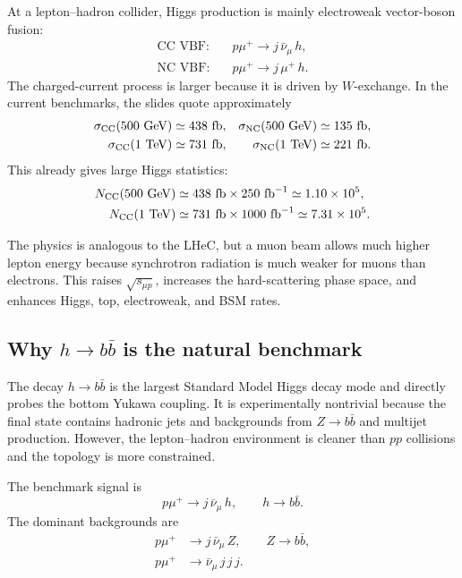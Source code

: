 \documentclass[11pt,a4paper]{article}
\newcommand{\gev}{\ensuremath{~\mathrm{GeV}}}
\newcommand{\tev}{\ensuremath{~\mathrm{TeV}}}
\newcommand{\invfb}{\ensuremath{~\mathrm{fb}^{-1}}}
\newcommand{\fb}{\ensuremath{~\mathrm{fb}}}
\newenvironment{learningnote}[1]{%
\par\medskip\noindent{\large\bfseries\color{darkblue}#1}\par\noindent
\begin{minipage}{0.97\linewidth}
}{\end{minipage}\par\medskip}
\begin{document}
At a lepton--hadron collider, Higgs production is mainly electroweak vector-boson fusion:
\begin{align}
  \text{CC VBF:}\quad & p\mu^+\to j\,\bar\nu_\mu\,h,\\
  \text{NC VBF:}\quad & p\mu^+\to j\,\mu^+\,h.
\end{align}
The charged-current process is larger because it is driven by \(W\)-exchange.  In the current
benchmarks, the slides quote approximately
\begin{align}
  \sigma_{\rm CC}(500\gev)&\simeq438\fb, &
  \sigma_{\rm NC}(500\gev)&\simeq135\fb,\\
  \sigma_{\rm CC}(1\tev)&\simeq731\fb, &
  \sigma_{\rm NC}(1\tev)&\simeq221\fb.
\end{align}
This already gives large Higgs statistics:
\begin{align}
  N_{\rm CC}(500\gev)&\simeq 438\fb\times250\invfb \simeq1.10\times10^5,\\
  N_{\rm CC}(1\tev)&\simeq 731\fb\times1000\invfb \simeq7.31\times10^5.
\end{align}

\begin{learningnote}{Why the muon beam matters}
\vspace{0.25cm}
The physics is analogous to the LHeC, but a muon beam allows much higher lepton energy
because synchrotron radiation is much weaker for muons than electrons.  This raises
\(\sqrt{s_{\mu p}}\), increases the hard-scattering phase space, and enhances Higgs, top,
electroweak, and BSM rates.
\end{learningnote}

\subsection{Why \(h\to b\bar b\) is the natural benchmark}

The decay \(h\to b\bar b\) is the largest Standard Model Higgs decay mode and directly
probes the bottom Yukawa coupling.  It is experimentally nontrivial because the final state
contains hadronic jets and backgrounds from \(Z\to b\bar b\) and multijet production.
However, the lepton--hadron environment is cleaner than \(pp\) collisions and the topology
is more constrained.

The benchmark signal is
\begin{equation}
  p\mu^+\to j\,\bar\nu_\mu\,h,\qquad h\to b\bar b .
\end{equation}
The dominant backgrounds are
\begin{align}
  p\mu^+&\to j\,\bar\nu_\mu\,Z,\qquad Z\to b\bar b,\\
  p\mu^+&\to \bar\nu_\mu\,j\,j\,j .
\end{align}
\end{document}
